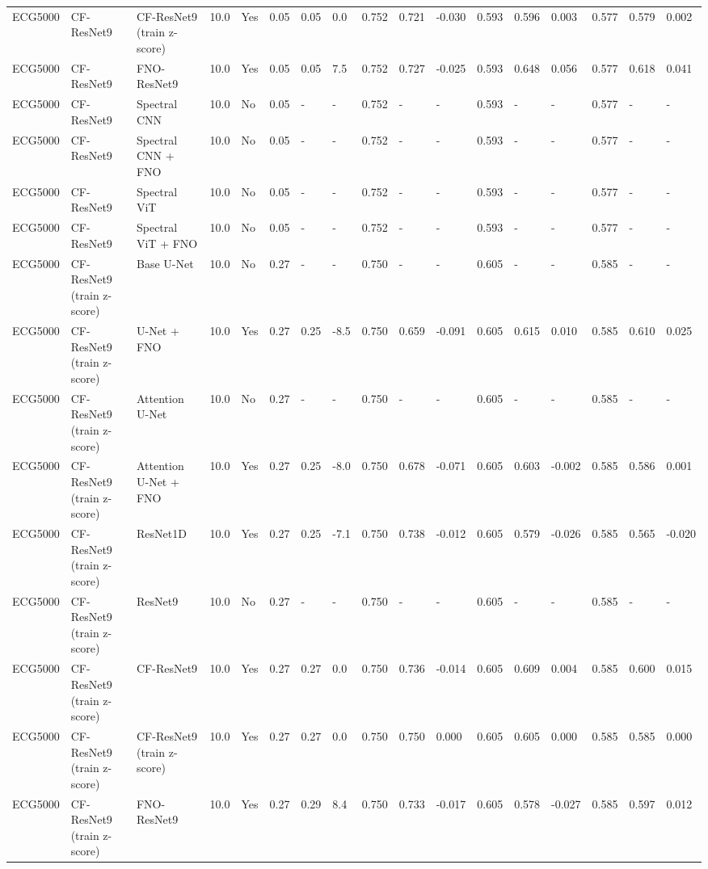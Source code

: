 \begin{longtable}{lllllllllllllllll}
ECG5000 & CF-ResNet9 & CF-ResNet9 (train z-score) & 10.0 & Yes & 0.05 & 0.05 & 0.0 & 0.752 & 0.721 & -0.030 & 0.593 & 0.596 & 0.003 & 0.577 & 0.579 & 0.002 \\
ECG5000 & CF-ResNet9 & FNO-ResNet9 & 10.0 & Yes & 0.05 & 0.05 & 7.5 & 0.752 & 0.727 & -0.025 & 0.593 & 0.648 & 0.056 & 0.577 & 0.618 & 0.041 \\
ECG5000 & CF-ResNet9 & Spectral CNN & 10.0 & No & 0.05 & - & - & 0.752 & - & - & 0.593 & - & - & 0.577 & - & - \\
ECG5000 & CF-ResNet9 & Spectral CNN + FNO & 10.0 & No & 0.05 & - & - & 0.752 & - & - & 0.593 & - & - & 0.577 & - & - \\
ECG5000 & CF-ResNet9 & Spectral ViT & 10.0 & No & 0.05 & - & - & 0.752 & - & - & 0.593 & - & - & 0.577 & - & - \\
ECG5000 & CF-ResNet9 & Spectral ViT + FNO & 10.0 & No & 0.05 & - & - & 0.752 & - & - & 0.593 & - & - & 0.577 & - & - \\
ECG5000 & CF-ResNet9 (train z-score) & Base U-Net & 10.0 & No & 0.27 & - & - & 0.750 & - & - & 0.605 & - & - & 0.585 & - & - \\
ECG5000 & CF-ResNet9 (train z-score) & U-Net + FNO & 10.0 & Yes & 0.27 & 0.25 & -8.5 & 0.750 & 0.659 & -0.091 & 0.605 & 0.615 & 0.010 & 0.585 & 0.610 & 0.025 \\
ECG5000 & CF-ResNet9 (train z-score) & Attention U-Net & 10.0 & No & 0.27 & - & - & 0.750 & - & - & 0.605 & - & - & 0.585 & - & - \\
ECG5000 & CF-ResNet9 (train z-score) & Attention U-Net + FNO & 10.0 & Yes & 0.27 & 0.25 & -8.0 & 0.750 & 0.678 & -0.071 & 0.605 & 0.603 & -0.002 & 0.585 & 0.586 & 0.001 \\
ECG5000 & CF-ResNet9 (train z-score) & ResNet1D & 10.0 & Yes & 0.27 & 0.25 & -7.1 & 0.750 & 0.738 & -0.012 & 0.605 & 0.579 & -0.026 & 0.585 & 0.565 & -0.020 \\
ECG5000 & CF-ResNet9 (train z-score) & ResNet9 & 10.0 & No & 0.27 & - & - & 0.750 & - & - & 0.605 & - & - & 0.585 & - & - \\
ECG5000 & CF-ResNet9 (train z-score) & CF-ResNet9 & 10.0 & Yes & 0.27 & 0.27 & 0.0 & 0.750 & 0.736 & -0.014 & 0.605 & 0.609 & 0.004 & 0.585 & 0.600 & 0.015 \\
ECG5000 & CF-ResNet9 (train z-score) & CF-ResNet9 (train z-score) & 10.0 & Yes & 0.27 & 0.27 & 0.0 & 0.750 & 0.750 & 0.000 & 0.605 & 0.605 & 0.000 & 0.585 & 0.585 & 0.000 \\
ECG5000 & CF-ResNet9 (train z-score) & FNO-ResNet9 & 10.0 & Yes & 0.27 & 0.29 & 8.4 & 0.750 & 0.733 & -0.017 & 0.605 & 0.578 & -0.027 & 0.585 & 0.597 & 0.012 \\

\end{longtable}
